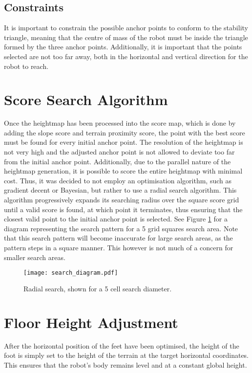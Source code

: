     \subsection{Constraints}
    It is important to constrain the possible anchor points to conform to the stability triangle, meaning that the centre of mass of the robot must be inside the triangle formed by the three anchor points. Additionally, it is important that the points selected are not too far away, both in the horizontal and vertical direction for the robot to reach.


\section{Score Search Algorithm} \label{sec:radial_search}
    Once the heightmap has been processed into the score map, which is done by adding the
    slope score and terrain proximity score, the point with the best score must be found for every initial anchor point. The resolution of the heightmap is not very high and the adjusted anchor point is not allowed to deviate too far from the initial anchor point. Additionally, due to the parallel nature of the heightmap generation, it is possible to score the entire heightmap with minimal cost. Thus, it was decided to not employ an optimisation algorithm, such as gradient decent or Bayesian, but rather to use a radial search algorithm. This algorithm progressively expands its searching radius over the square score grid until a valid score is found, at which point it
    terminates, thus ensuring that the closest valid point to the initial anchor point is selected. See Figure \ref{fig:radial_search} for a diagram representing the search pattern for a 5 grid squares search area. Note that this search pattern will become inaccurate for large search areas, as the pattern steps in a square manner. This however is not much of a concern for smaller search areas.

    \begin{figure}[h]
        \centering
        \texttt{[image: search\_diagram.pdf]}
        \caption{Radial search, shown for a 5 cell search diameter.}
        \label{fig:radial_search}
    \end{figure}

    \section{Floor Height Adjustment} \label{sec:height_adjust}
    After the horizontal position of the feet have been optimised, the height of the foot is simply set to the height of the terrain at the target horizontal coordinates. This ensures that the robot's body remains level and at a constant global height.

